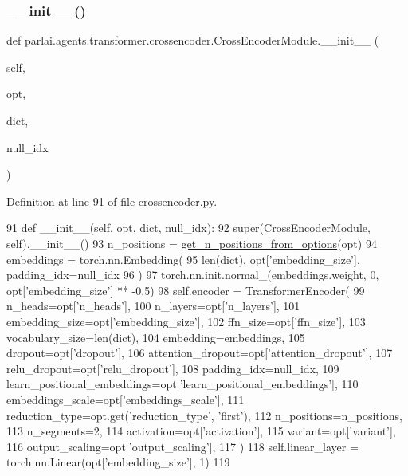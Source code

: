 \subsubsection{\texorpdfstring{\+\_\+\+\_\+init\+\_\+\+\_\+()}{\_\_init\_\_()}}
{\footnotesize\ttfamily def parlai.\+agents.\+transformer.\+crossencoder.\+Cross\+Encoder\+Module.\+\_\+\+\_\+init\+\_\+\+\_\+ (\begin{DoxyParamCaption}\item[{}]{self,  }\item[{}]{opt,  }\item[{}]{dict,  }\item[{}]{null\+\_\+idx }\end{DoxyParamCaption})}



Definition at line 91 of file crossencoder.\+py.


\begin{DoxyCode}
91     \textcolor{keyword}{def }\_\_init\_\_(self, opt, dict, null\_idx):
92         super(CrossEncoderModule, self).\_\_init\_\_()
93         n\_positions = \hyperlink{namespaceparlai_1_1agents_1_1transformer_1_1modules_ab67607512c597ddd54f2b60a1a1eaf4c}{get\_n\_positions\_from\_options}(opt)
94         embeddings = torch.nn.Embedding(
95             len(dict), opt[\textcolor{stringliteral}{'embedding\_size'}], padding\_idx=null\_idx
96         )
97         torch.nn.init.normal\_(embeddings.weight, 0, opt[\textcolor{stringliteral}{'embedding\_size'}] ** -0.5)
98         self.encoder = TransformerEncoder(
99             n\_heads=opt[\textcolor{stringliteral}{'n\_heads'}],
100             n\_layers=opt[\textcolor{stringliteral}{'n\_layers'}],
101             embedding\_size=opt[\textcolor{stringliteral}{'embedding\_size'}],
102             ffn\_size=opt[\textcolor{stringliteral}{'ffn\_size'}],
103             vocabulary\_size=len(dict),
104             embedding=embeddings,
105             dropout=opt[\textcolor{stringliteral}{'dropout'}],
106             attention\_dropout=opt[\textcolor{stringliteral}{'attention\_dropout'}],
107             relu\_dropout=opt[\textcolor{stringliteral}{'relu\_dropout'}],
108             padding\_idx=null\_idx,
109             learn\_positional\_embeddings=opt[\textcolor{stringliteral}{'learn\_positional\_embeddings'}],
110             embeddings\_scale=opt[\textcolor{stringliteral}{'embeddings\_scale'}],
111             reduction\_type=opt.get(\textcolor{stringliteral}{'reduction\_type'}, \textcolor{stringliteral}{'first'}),
112             n\_positions=n\_positions,
113             n\_segments=2,
114             activation=opt[\textcolor{stringliteral}{'activation'}],
115             variant=opt[\textcolor{stringliteral}{'variant'}],
116             output\_scaling=opt[\textcolor{stringliteral}{'output\_scaling'}],
117         )
118         self.linear\_layer = torch.nn.Linear(opt[\textcolor{stringliteral}{'embedding\_size'}], 1)
119 
\end{DoxyCode}


